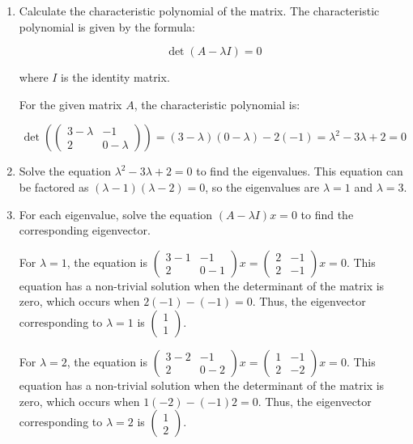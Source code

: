 \documentclass{article}
\begin{document}
\begin{enumerate}
    \item Calculate the characteristic polynomial of the matrix. The characteristic polynomial is given by the formula:
    
    \[\det(A - \lambda I) = 0\]
    
    where $I$ is the identity matrix.
    
    For the given matrix $A$, the characteristic polynomial is:
    
    \[\det\left(\begin{pmatrix} 3-\lambda & -1 \\ 2 & 0-\lambda \end{pmatrix}\right) = (3-\lambda)(0-\lambda) - 2(-1) = \lambda^2 - 3\lambda +2 = 0\]
    
    \item Solve the equation $\lambda^2 - 3\lambda +2 = 0$ to find the eigenvalues. This equation can be factored as $(\lambda-1)(\lambda-2) = 0$, so the eigenvalues are $\lambda = 1$ and $\lambda = 3$.
    
    \item For each eigenvalue, solve the equation $(A - \lambda I)x = 0$ to find the corresponding eigenvector.
    
    For $\lambda = 1$, the equation is $\begin{pmatrix} 3-1 & -1 \\ 2 & 0-1 \end{pmatrix}x = \begin{pmatrix} 2 & -1 \\ 2 & -1 \end{pmatrix}x = 0$. This equation has a non-trivial solution when the determinant of the matrix is zero, which occurs when $2(-1) - (-1) = 0$. Thus, the eigenvector corresponding to $\lambda = 1$ is $\begin{pmatrix} 1 \\ 1 \end{pmatrix}$.
    
    For $\lambda = 2$, the equation is $\begin{pmatrix} 3-2 & -1 \\ 2 & 0-2 \end{pmatrix}x = \begin{pmatrix} 1 & -1 \\ 2 & -2 \end{pmatrix}x = 0$. This equation has a non-trivial solution when the determinant of the matrix is zero, which occurs when $1(-2) - (-1)2 = 0$. Thus, the eigenvector corresponding to $\lambda = 2$ is $\begin{pmatrix} 1 \\ 2 \end{pmatrix}$.
    
\end{enumerate}
\end{document}
